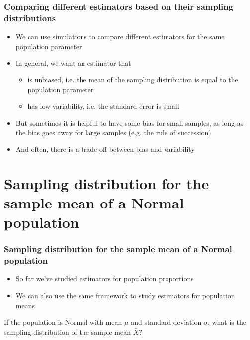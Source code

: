 \documentclass[t,compress,mathserif]{beamer}
\begin{document}
\begin{frame}
    \frametitle{Comparing different estimators based on their sampling distributions}

    \begin{itemize}
        \item We can use simulations to compare different estimators for the same population parameter
        \item In general, we want an estimator that
        \begin{itemize}
            \item is unbiased, i.e. the mean of the sampling distribution is equal to the population parameter
            \item has low variability, i.e. the standard error is small
        \end{itemize}
        \item But sometimes it is helpful to have some bias for small samples, as long as the bias goes away for large samples (e.g. the rule of succession)
        \item And often, there is a trade-off between bias and variability
    \end{itemize}
\end{frame}


\section{Sampling distribution for the sample mean of a Normal population}

\begin{frame}
\frametitle{Sampling distribution for the sample mean of a Normal population}
\begin{itemize}
    \item So far we've studied estimators for population proportions
    \item We can also use the same framework to study estimators for population means
\end{itemize}
If the population is Normal with mean $\mu$ and standard deviation $\sigma$, what is the sampling distribution of the sample mean $\bar{X}$?
\end{frame}
\end{document}
